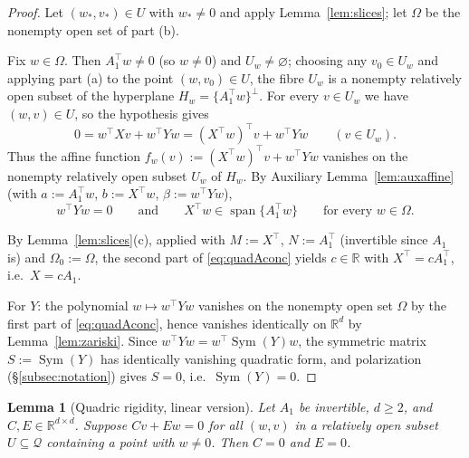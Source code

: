 \documentclass[11pt]{article}
\newtheorem{lemma}[theorem]{Lemma}
\theoremstyle{definition}
\theoremstyle{remark}
\theoremstyle{plain}
\newcommand{\R}{\mathbb{R}}
\newcommand{\cQ}{\mathcal{Q}}
\newcommand{\Sym}{\operatorname{Sym}}
\newcommand{\spn}{\operatorname{span}}
\begin{document}
\begin{proof}
Let $(w_*,v_*)\in U$ with $w_*\neq0$ and apply Lemma~\ref{lem:slices}; let $\Omega$ be
the nonempty open set of part (b).

Fix $w\in\Omega$.  Then $A_1^\top w\neq0$ (so $w\neq0$) and $U_w\neq\varnothing$;
choosing any $v_0\in U_w$ and applying part (a) to the point $(w,v_0)\in U$, the fibre
$U_w$ is a nonempty relatively open subset of the hyperplane
$H_w=\{A_1^\top w\}^\perp$.  For every $v\in U_w$ we have $(w,v)\in U$, so the hypothesis
gives
\[
0=w^\top Xv+w^\top Yw=(X^\top w)^\top v+w^\top Yw\qquad(v\in U_w).
\]
Thus the affine function $f_w(v):=(X^\top w)^\top v+w^\top Yw$ vanishes on the nonempty
relatively open subset $U_w$ of $H_w$.  By Auxiliary Lemma~\ref{lem:auxaffine} (with
$a:=A_1^\top w$, $b:=X^\top w$, $\beta:=w^\top Yw$),
\begin{equation}\label{eq:quadAconc}
w^\top Yw=0\qquad\text{and}\qquad X^\top w\in\spn\{A_1^\top w\}
\qquad\text{for every }w\in\Omega .
\end{equation}

By Lemma~\ref{lem:slices}(c), applied with $M:=X^\top$, $N:=A_1^\top$ (invertible since
$A_1$ is) and $\Omega_0:=\Omega$, the second part of \eqref{eq:quadAconc} yields
$c\in\R$ with $X^\top=cA_1^\top$, i.e.\ $X=cA_1$.

For $Y$: the polynomial $w\mapsto w^\top Yw$ vanishes on the nonempty open set $\Omega$
by the first part of \eqref{eq:quadAconc}, hence vanishes identically on $\R^d$ by
Lemma~\ref{lem:zariski}.  Since $w^\top Yw=w^\top\Sym(Y)w$, the symmetric matrix
$S:=\Sym(Y)$ has identically vanishing quadratic form, and polarization
(\S\ref{subsec:notation}) gives $S=0$, i.e.\ $\Sym(Y)=0$.
\end{proof}

\begin{lemma}[Quadric rigidity, linear version]\label{lem:quadB}
Let $A_1$ be invertible, $d\ge2$, and $C,E\in\R^{d\times d}$.  Suppose $Cv+Ew=0$ for all
$(w,v)$ in a relatively open subset $U\subseteq\cQ$ containing a point with $w\neq0$.
Then $C=0$ and $E=0$.
\end{lemma}
\end{document}
